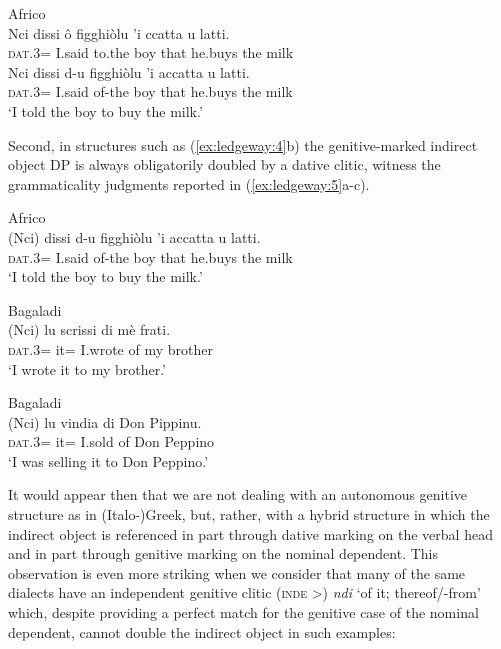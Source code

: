 \documentclass[output=paper,modfonts,nonflat]{langsci/langscibook}
\begin{document}
\ea\label{ex:ledgeway:4}
  Africo\\
\ea
	\gll Nci  dissi  ô  figghiòlu  ’i  ccatta  u  latti.\\
    \textsc{dat}.3=  I.said  to.the  boy  that  he.buys  the  milk\\

\ex
	\gll Nci  dissi  d-u  figghiòlu  ’i  accatta  u  latti.\\
    \textsc{dat}.3=  I.said  of-the  boy  that  he.buys  the  milk\\
    \glt `I told the boy to buy the milk.' 
    \z
    \z

Second, in structures such as (\ref{ex:ledgeway:4}b) the genitive-marked indirect object DP is always obligatorily doubled by a dative clitic, witness the grammaticality judgments reported in (\ref{ex:ledgeway:5}a-c). 

\ea\label{ex:ledgeway:5}
\ea Africo\\
\gll        *(Nci)  dissi  d-u  figghiòlu  ’i  accatta  u  latti.\\
      \textsc{dat}.3=  I.said  of-the  boy  that  he.buys  the  milk\\
      \glt `I told the boy to buy the milk.'

    \ex   Bagaladi\\
          \gll *(Nci)  lu  scrissi  di  mè  frati.\\
      \textsc{dat}.3=  it=  I.wrote  of  my  brother\\
      \glt `I wrote it to my brother.'
    
    \ex  Bagaladi\\
          \gll *(Nci)  lu  vindia  di  Don  Pippinu.\\
      \textsc{dat}.3=  it=  I.sold  of  Don  Peppino\\
      \glt `I was selling it to Don Peppino.'
\z
\z

It would appear then that we are not dealing with an autonomous genitive structure as in (Italo-)Greek, but, rather, with a hybrid structure in which the indirect object is referenced in part through dative marking on the verbal head and in part through genitive marking on the nominal dependent. This observation is even more striking when we consider that many of the same dialects have an independent genitive clitic (\textsc{inde} >) \textit{ndi} ‘of it; thereof/-from’ which, despite providing a perfect match for the genitive case of the nominal dependent, cannot double the indirect object in such examples:
\end{document}
